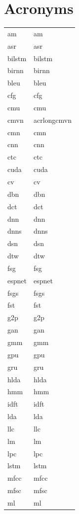 \documentclass[12pt,twoside]{report}
\begin{document}
\begin{table}[tp]
\chapter*{Acronyms}
  \label{tab:acronymns}
\begin{tabular}{ll}
\acrshort{am} & \acrlong{am}\\
\acrshort{asr} & \acrlong{asr}\\
\acrshort{bilstm} & \acrlong{bilstm}\\
\acrshort{birnn} & \acrlong{birnn}\\
\acrshort{bleu} & \acrlong{bleu}\\
\acrshort{cfg} & \acrlong{cfg} \\
\acrshort{cmu} & \acrlong{cmu} \\
\acrshort{cmvn} & acrlong{cmvn} \\
\acrshort{cmn} & \acrlong{cmn} \\
\acrshort{cnn} & \acrlong{cnn} \\
\acrshort{ctc} & \acrlong{ctc} \\
\acrshort{cuda} & \acrlong{cuda} \\
\acrshort{cv} & \acrlong{cv} \\
\acrshort{dbn} & \acrlong{dbn} \\
\acrshort{dct} & \acrlong{dct} \\
\acrshort{dnn} & \acrlong{dnn} \\
\acrshort{dnns} & \acrlong{dnns} \\
\acrshort{dsn} & \acrlong{dsn} \\
\acrshort{dtw} & \acrlong{dtw} \\
\acrshort{fsg} & \acrlong{fsg} \\
\acrshort{espnet} & \acrlong{espnet} \\
\acrshort{fsgs} & \acrlong{fsgs} \\
\acrshort{fst} & \acrlong{fst} \\
\acrshort{g2p} & \acrlong{g2p} \\
\acrshort{gan} & \acrlong{gan} \\
\acrshort{gmm} & \acrlong{gmm} \\
\acrshort{gpu} & \acrlong{gpu} \\
\acrshort{gru} & \acrlong{gru} \\
\acrshort{hlda} & \acrlong{hlda} \\
\acrshort{hmm} & \acrlong{hmm} \\
\acrshort{idft} & \acrlong{idft} \\
\acrshort{lda} & \acrlong{lda} \\
\acrshort{llc} & \acrlong{llc} \\
\acrshort{lm} & \acrlong{lm} \\
\acrshort{lpc} & \acrlong{lpc} \\
\acrshort{lstm} & \acrlong{lstm} \\
\acrshort{mfcc} & \acrlong{mfcc} \\
\acrshort{mfsc} & \acrlong{mfsc} \\
\acrshort{ml} & \acrlong{ml} \\
\end{tabular}
\end{table}
\end{document}
